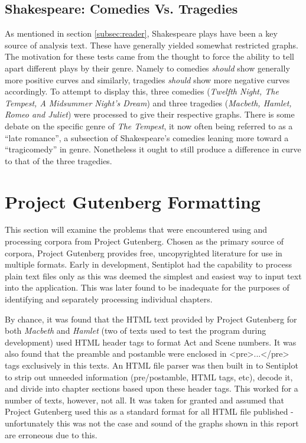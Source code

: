 \documentclass{article}
\begin{document}
    \subsection{Shakespeare: Comedies Vs. Tragedies}
    \label{subsec:comVsTrag}
        As mentioned in section \ref{subsec:reader}, Shakespeare plays have been a key source of analysis text. These have generally yielded somewhat restricted graphs. The motivation for these tests came from the thought to force the ability to tell apart different plays by their genre. Namely to comedies \textit{should} show generally more positive curves and similarly, tragedies \textit{should} show more negative curves accordingly. To attempt to display this, three comedies (\textit{Twelfth Night, The Tempest, A Midsummer Night's Dream}) and three tragedies (\textit{Macbeth, Hamlet, Romeo and Juliet}) were processed to give their respective graphs. There is some debate on the specific genre of \textit{The Tempest}, it now often being referred to as a ``late romance'', a subsection of Shakespeare's comedies leaning more toward a ``tragicomedy'' in genre. Nonetheless it ought to still produce a difference in curve to that of the three tragedies.
\newpage
\section{Project Gutenberg Formatting}
\label{sec:gutenbergFormat}
        This section will examine the problems that were encountered using and processing corpora from Project Gutenberg. Chosen as the primary source of corpora, Project Gutenberg provides free, uncopyrighted literature for use in multiple formats. Early in development, Sentiplot had the capability to process plain text files only as this was deemed the simplest and easiest way to input text into the application. This was later found to be inadequate for the purposes of identifying and separately processing individual chapters.

        By chance, it was found that the HTML text provided by Project Gutenberg for both \textit{Macbeth} and \textit{Hamlet} (two of texts used to test the program during development) used HTML header tags to format Act and Scene numbers. It was also found that the preamble and postamble were enclosed in <pre>...</pre> tags exclusively in this texts. An HTML file parser was then built in to Sentiplot to strip out unneeded information (pre/postamble, HTML tags, etc), decode it, and divide into chapter sections based upon these header tags. This worked for a number of texts, however, not all. It was taken for granted and assumed that Project Gutenberg used this as a standard format for all HTML file published - unfortunately this was not the case and sound of the graphs shown in this report are erroneous due to this.
        
\end{document}
